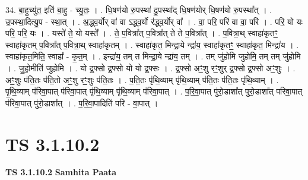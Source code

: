 \documentclass[17pt]{extarticle}
\begin{document}
34. बा॒हुच्यु॑त॒ इति॑ बा॒हु - च्यु॒तः॒ । . धि॒षण॑यो रु॒पस्था॑ दु॒पस्था᳚द् धि॒षण॑योर् धि॒षण॑यो रु॒पस्था᳚त् । . उ॒पस्था॒दित्यु॒प - स्था॒त् । . अ॒द्ध्व॒र्योर् वा॑ वा ऽद्ध्व॒र्यो र॑द्ध्व॒र्योर् वा᳚ । . वा॒ परि॒ परि॑ वा वा॒ परि॑ । . परि॒ यो यः परि॒ परि॒ यः । . यस्ते॑ ते॒ यो यस्ते᳚ । . ते॒ प॒वित्रा᳚त् प॒वित्रा᳚त् ते ते प॒वित्रा᳚त् । . प॒वित्रा॒थ् स्वाहा॑कृतꣳ॒॒ स्वाहा॑कृतम् प॒वित्रा᳚त् प॒वित्रा॒थ् स्वाहा॑कृतम् । . स्वाहा॑कृत॒ मिन्द्रा॒ये न्द्रा॑य॒ स्वाहा॑कृतꣳ॒॒ स्वाहा॑कृत॒ मिन्द्रा॑य । . स्वाहा॑कृत॒मिति॒ स्वाहा᳚ - कृ॒त॒म् । . इन्द्रा॑य॒ तम् त मिन्द्रा॒ये न्द्रा॑य॒ तम् । . तम् जु॑होमि जुहोमि॒ तम् तम् जु॑होमि । . जु॒हो॒मीति॑ जुहोमि । . यो द्र॒फ्सो द्र॒फ्सो यो यो द्र॒फ्सः । . द्र॒फ्सो अꣳ॒॒शु रꣳ॒॒शुर् द्र॒फ्सो द्र॒फ्सो अꣳ॒॒शुः । . अꣳ॒॒शुः प॑ति॒तः प॑ति॒तो अꣳ॒॒शु रꣳ॒॒शुः प॑ति॒तः । . प॒ति॒तः पृ॑थि॒व्याम् पृ॑थि॒व्याम् प॑ति॒तः प॑ति॒तः पृ॑थि॒व्याम् । . पृ॒थि॒व्याम् प॑रिवा॒पात् प॑रिवा॒पात् पृ॑थि॒व्याम् पृ॑थि॒व्याम् प॑रिवा॒पात् । . प॒रि॒वा॒पात् पु॑रो॒डाशा᳚त् पुरो॒डाशा᳚त् परिवा॒पात् प॑रिवा॒पात् पु॑रो॒डाशा᳚त् । . प॒रि॒वा॒पादिति॑ परि - वा॒पात् । \newline
\pagebreak
{}

\section{ TS 3.1.10.2 }

\textbf{TS 3.1.10.2 } \newline
\textbf{Samhita Paata} \newline
\end{document}
